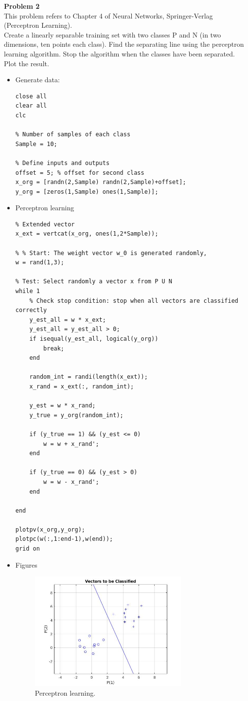 \documentclass[12pt]{article}
\begin{document}
\textbf{Problem 2}
\\This problem refers to Chapter 4 of Neural Networks, Springer-Verlag (Perceptron Learning).
\\Create a linearly separable training set with two classes P and N (in two dimensions, ten points
each class). Find the separating line using the perceptron learning algorithm. Stop the
algorithm when the classes have been separated. Plot the result.
\begin{itemize}
    \item Generate data: 
\begin{lstlisting}
close all
clear all
clc

% Number of samples of each class
Sample = 10;

% Define inputs and outputs
offset = 5; % offset for second class
x_org = [randn(2,Sample) randn(2,Sample)+offset]; 
y_org = [zeros(1,Sample) ones(1,Sample)]; 
\end{lstlisting}
\item Perceptron learning
\begin{lstlisting}
% Extended vector
x_ext = vertcat(x_org, ones(1,2*Sample));

% % Start: The weight vector w_0 is generated randomly,
w = rand(1,3);

% Test: Select randomly a vector x from P U N
while 1  
    % Check stop condition: stop when all vectors are classified correctly
    y_est_all = w * x_ext;
    y_est_all = y_est_all > 0;
    if isequal(y_est_all, logical(y_org))
        break;
    end
    
    random_int = randi(length(x_ext));
    x_rand = x_ext(:, random_int);

    y_est = w * x_rand;
    y_true = y_org(random_int);    

    if (y_true == 1) && (y_est <= 0)
        w = w + x_rand';
    end

    if (y_true == 0) && (y_est > 0)
        w = w - x_rand';
    end
        
end

plotpv(x_org,y_org);
plotpc(w(:,1:end-1),w(end));
grid on
\end{lstlisting}
\item Figures
\begin{figure}[H]
\begin{center}
  \caption{Perceptron learning.}
  \includegraphics[width=0.75\textwidth]{images/Fig2-1.jpg}
 \end{center}
\end{figure}
\end{itemize}
\end{document}
